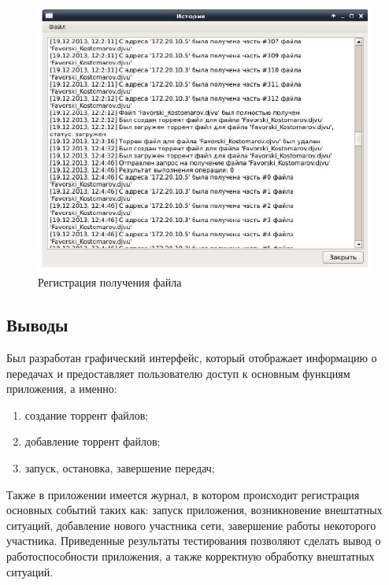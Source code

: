 \begin{figure}[!hbt]
    \centering
    \includegraphics[width=\textwidth]{log_21}
    \caption{Регистрация получения файла}\label{log_21}
\end{figure}

\vfill
\clearpage
\subsection*{Выводы}
Был разработан графический интерфейс, который отображает информацию о
передачах и предоставляет пользователю доступ к основным функциям
приложения, а именно:
\begin{enumerate}
    \item создание торрент файлов;
    \item добавление торрент файлов;
    \item запуск, остановка, завершение передач;
\end{enumerate}

Также в приложении имеется журнал, в котором происходит регистрация
основных событий таких как: запуск приложения, возникновение
внештатных ситуаций, добавление нового участника сети, завершение работы
некоторого участника.
\newpar
Приведенные результаты тестирования позволяют сделать вывод о
работоспособности приложения, а также корректную обработку внештатных
ситуаций.

